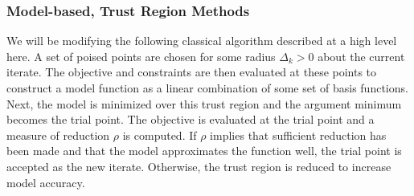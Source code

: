 \documentclass{article}
\begin{document}
\cite{doi:10.1080/10556788.2015.1026968}

\cite{Tröltzsch2016}
\cite{infeasiblestarting}
\cite{Gao2018}











\cite{Conejo:2013:GCT:2620806.2621814}
\cite{doi:10.1137/151005683}
\cite{Audet2016APB}
\cite{Tröltzsch2016}
\cite{doi:10.1080/02331934.2016.1263629}
\cite{infeasiblestarting}
\cite{doi:10.1080/10556780802409296}
\cite{doi:10.1080/10556788.2015.1026968}
\cite{doi:10.1093/imanum/drx043}
\cite{Beyhaghi2017}
\cite{Golovin:2017:GVS:3097983.3098043}
\cite{DBLP:journals/ol/KamandiAA17}
\cite{1742-6596-874-1-012062}
\cite{KS2018}
\cite{8247938} 
\cite{doi:10.1002/aic.16364}
\cite{AuHa2017}
\cite{Verdério2017}
\cite{Gao2017}
\cite{Cheng2017}
\cite{Martínez2013}
\cite{AMAIOUA201813}
\cite{Amaran2014}
\cite{Costa2014RBFOptA}
\cite{doi:10.1137/15M1031679}
\cite{Gao2018}
\cite{PLOSKAS201816}
\cite{doi:10.1137/1.9781611974683.ch37}
\cite{Powell2015}
\cite{Kamandi2017}
\cite{Kieslich2018}
\cite{DUMMY:Biegler}
\cite{DUMMY:Fletcher}
\cite{DUMMY:Brekelman}
\cite{DUMMY:CombineTrustAndLine}
\cite{DUMMY:linesearch_global}
\cite{DUMMY:linesearch_local}
\cite{DUMMY:intro_book}
\cite{DUMMY:trust_funnel_dfo}
\cite{DUMMY:original_filter}
\cite{DUMMY:sqp_filter}
\cite{DUMMY:Colson2004}
\cite{DUMMY:SQPFilter}
\cite{DUMMY:Rios2013}
\cite{DUMMY:PowellRadialBasis}
\cite{DUMMY:leastsquares}
\cite{DUMMY:typesofconstraints}
\cite{DUMMY:FasanoLLR14}
\cite{DUMMY:filterpattern}
\cite{DUMMY:activeset1}
\cite{DUMMY:LiuzziLS10}
\cite{DUMMY:augmented}






\subsubsection{Model-based, Trust Region Methods}
We will be modifying the following classical algorithm described at a high level here.
A set of poised points are chosen for some radius $\Delta_k>0$ about the current iterate.
The objective and constraints are then evaluated at these points to construct a model function as a linear combination of some set of basis functions.
Next, the model is minimized over this trust region and the argument minimum becomes the trial point.
The objective is evaluated at the trial point and a measure of reduction $\rho$ is computed.
If $\rho$ implies that sufficient reduction has been made and that the model approximates the function well, the trial point is accepted as the new iterate.
Otherwise, the trust region is reduced to increase model accuracy.
\end{document}
